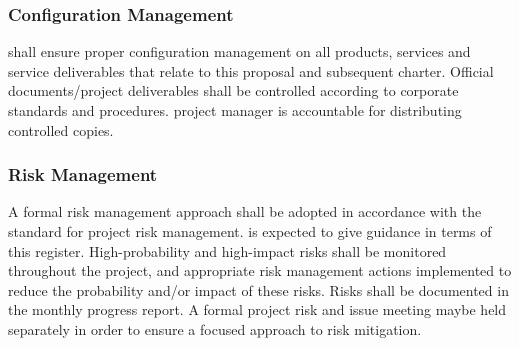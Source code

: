 \subsubsection{Configuration Management}
\slist
\spit \client shall ensure proper configuration management on all products, services and service deliverables that relate to this proposal and subsequent charter. Official documents/project deliverables shall be controlled according to \clients corporate standards and procedures.
\spit \clients project manager is accountable for distributing controlled copies. 
\elist
\subsubsection{Risk Management}
\slist
\spit A formal risk management approach shall be adopted in accordance with the \client standard for project risk management. \client is expected to give guidance in terms of this register.
\spit High-probability and high-impact risks shall be monitored throughout the project, and appropriate risk management actions implemented to reduce the probability and/or impact of these risks. Risks shall be documented in the monthly progress report.
\spit A formal project risk and issue meeting maybe held separately in order to ensure a focused approach to risk mitigation.
\elist
